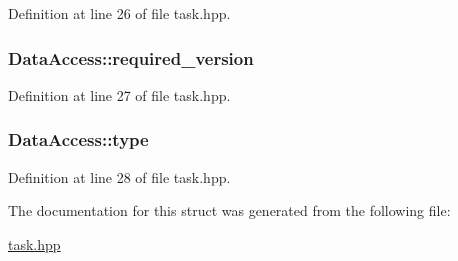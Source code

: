 Definition at line 26 of file task.hpp.\hypertarget{struct_data_access_a96ee68f6c0475d76d09a15b437746d8b}{
\subsubsection[{required\_\-version}]{ {\bf DataAccess::required\_\-version}}}
\label{struct_data_access_a96ee68f6c0475d76d09a15b437746d8b}


Definition at line 27 of file task.hpp.\hypertarget{struct_data_access_a8ca53e9ad20a0f233f4c9f0f42f4c967}{
\subsubsection[{type}]{ {\bf DataAccess::type}}}
\label{struct_data_access_a8ca53e9ad20a0f233f4c9f0f42f4c967}


Definition at line 28 of file task.hpp.

The documentation for this struct was generated from the following file:\begin{DoxyCompactItemize}
\item 
\hyperlink{task_8hpp}{task.hpp}\end{DoxyCompactItemize}
